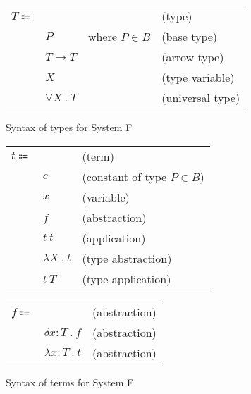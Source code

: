 \documentclass[acmlarge]{acmart}
\begin{document}
  \newcommand\labs[2]{\lambda #1 \ . \ #2}
  \newcommand\dabs[2]{\delta #1 \ . \ #2}
  \newcommand\lapp[2]{#1 \ #2}
  \newcommand\lsub[3]{#1 \left[ #2 \mapsto #3 \right]}

  \newcommand\evalsto[2]{#1 \longrightarrow #2}

  \newcommand\tarrow[2]{#1 \rightarrow #2}
  \newcommand\tforall[2]{\forall #1 \ . \ #2}

  \begin{figure}[h!]
    \begin{mdframed}

      \begin{tabular}{l l l l}
        $T \Coloneqq $ & & & (type) \\
        & $P$ & where $P \in B$ & (base type) \\
        & $T \rightarrow T$ & & (arrow type) \\
        & $X$ & & (type variable) \\
        & $\tforall{X}{T}$ & & (universal type) \\
      \end{tabular}

    \end{mdframed}
    \caption{Syntax of types for System F}
    \label{fig:system_f_types_syntax}
  \end{figure}

  \begin{figure}[h!]
    \begin{mdframed}

      \begin{tabular}{l l l}
        $t \Coloneqq $ & & (term) \\
        & $c$ & (constant of type $P \in B$) \\
        & $x$ & (variable) \\
        & $f$ & (abstraction) \\
        & $\lapp{t}{t}$ & (application) \\
        & $\labs{X}{t}$ & (type abstraction) \\
        & $\lapp{t}{T}$ & (type application)
      \end{tabular}

      \begin{tabular}{l l l}
        $f \Coloneqq $ & & (abstraction) \\
        & $\dabs{x : T}{f}$ & (abstraction) \\
        & $\labs{x : T}{t}$ & (abstraction)
      \end{tabular}

    \end{mdframed}
    \caption{Syntax of terms for System F}
    \label{fig:system_f_terms_syntax}
  \end{figure}
\end{document}
